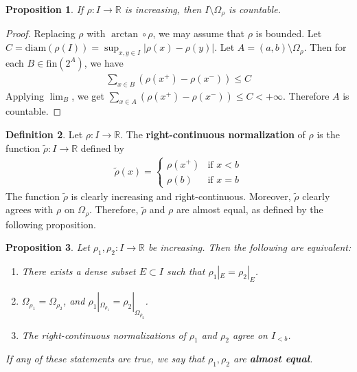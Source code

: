 \documentclass[12pt,b5paper,notitlepage]{article}
\theoremstyle{definition}
\newtheorem{df}{Definition}[subsection]
\theoremstyle{plain}
\newtheorem{pp}[df]{Proposition}
\newcommand{\wtd}{\widetilde}
\newcommand{\Rbb}{\mathbb R}
\newcommand{\fin}{\mathrm{fin}}
\newcommand{\diam}{\mathrm{diam}}
\numberwithin{equation}{section}
\begin{document}
\begin{pp}\label{lb62}
If $\rho:I\rightarrow\Rbb$ is increasing, then $I\setminus\Omega_\rho$ is countable.
\end{pp}

\begin{proof}
Replacing $\rho$ with $\arctan\circ\rho$, we may assume that $\rho$ is bounded. Let $C=\diam(\rho(I))=\sup_{x,y\in I}|\rho(x)-\rho(y)|$. Let $A=(a,b)\setminus\Omega_\rho$. Then for each $B\in\fin(2^A)$, we have
\begin{align*}
\sum_{x\in B}(\rho(x^+)-\rho(x^-))\leq C
\end{align*}
Applying $\lim_B$, we get $\sum_{x\in A}(\rho(x^+)-\rho(x^-))\leq C<+\infty$. Therefore $A$ is countable.
\end{proof}


\begin{df}
Let $\rho:I\rightarrow\Rbb$. The \textbf{right-continuous normalization}  of $\rho$ is the function $\wtd\rho:I\rightarrow \Rbb$ defined by
\begin{gather*}
\wtd\rho(x)=\left\{
\begin{array}{ll}
\rho(x^+)&\text{if }x<b\\[0.5ex]
\rho(b)&\text{if }x=b
\end{array}
\right.
\end{gather*}
The function $\wtd\rho$ is clearly increasing and right-continuous. Moreover, $\wtd\rho$ clearly agrees with $\rho$ on $\Omega_\rho$. Therefore, $\wtd\rho$ and $\rho$ are almost equal, as defined by the following proposition.
\end{df}



\begin{pp}\label{lb70}
Let $\rho_1,\rho_2:I\rightarrow\Rbb$ be increasing. Then the following are equivalent:
\begin{enumerate}[label=(\alph*)]
\item There exists a dense subset $E\subset I$ such that $\rho_1|_E=\rho_2|_E$.
\item $\Omega_{\rho_1}=\Omega_{\rho_2}$, and $\rho_1|_{\Omega_{\rho_1}}=\rho_2|_{\Omega_{\rho_2}}$.
\item The right-continuous normalizations of $\rho_1$ and $\rho_2$ agree on $I_{<b}$.
\end{enumerate}
If any of these statements are true, we say that $\rho_1,\rho_2$ are \textbf{almost equal}. 
\end{pp}
\end{document}

